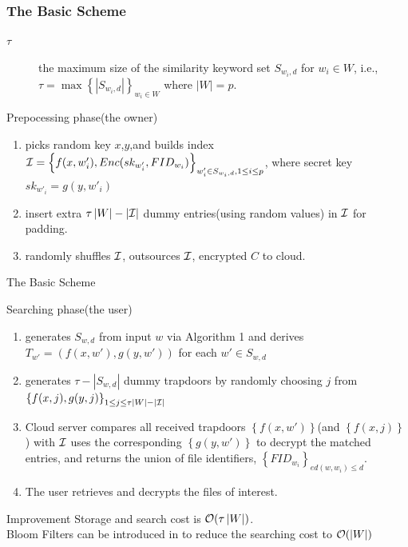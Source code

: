 \documentclass{beamer}
\begin{document}
\begin{frame}
	\frametitle{The Basic Scheme}
	\begin{block}{}
		\begin{description}
			\item[$\tau $]the maximum size of the similarity keyword set $S_{{w_i},d}$ for ${w_i} \in W$, i.e.,$\tau  = \max {\left\{ {\left| {{S_{{w_i},d}}} \right|} \right\}_{{w_i} \in W}}$ where $\left| W \right| = p$.
		\end{description}
	\end{block}
		\begin{exampleblock}{Prepocessing phase(the owner)}
			\begin{enumerate}
				\item  picks random key $x$,$y$,and builds index ${\cal I} = {\left\{ {f(x,w{'_i}),Enc(s{k_{w{'_i}}},FI{D_{{w_i}}})} \right\}_{w{'_i} \in {S_{{w_i},d}},1 \le i \le p}}$, where secret key $s{k_{w{'_i}}} = g(y,w{'_i})$
				\item insert extra $\tau \left| W \right| - \left| {\cal I} \right|$ dummy entries(using random values) in $\cal I$ for padding.
				\item randomly shuffles $\cal I$, outsources $\cal I$, encrypted $C$ to cloud.
			\end{enumerate}
		\end{exampleblock}
\end{frame}

\begin{frame}{The Basic Scheme}
	\begin{alertblock}{Searching phase(the user)}
		\begin{enumerate}
			\item generates ${{S_{w,d}}}$ from input $w$ via Algorithm 1 and derives ${T_{w'}} = (f(x,w'),g(y,w'))$ for each $w' \in {S_{w,d}}$
			\item generates $\tau  - \left| {{S_{w,d}}} \right|$ dummy trapdoors by randomly choosing $j$ from ${\left\{ {f(x,j),g(y,j)} \right\}_{1 \le j \le \tau \left| W \right| - \left| {\cal I} \right|}}$
			\item Cloud server compares all received trapdoors $\left\{ {f(x,w')} \right\}$(and $\left\{ {f(x,j)} \right\}$) with ${\cal I}$ uses the corresponding $\left\{ {g(y,w')} \right\}$ to decrypt the matched entries,  and returns the union of file identifiers, ${\left\{ {FI{D_{{w_i}}}} \right\}_{ed(w,{w_i}) \le d}}$.
			\item The user retrieves and decrypts the files of interest.
		\end{enumerate}
	\end{alertblock}
	\begin{block}{Improvement}
		Storage and search cost is ${\cal O}(\tau \left| W \right|)$.\\
		Bloom Filters can be introduced in to reduce the searching cost to  ${\cal O}( \left| W \right|)$
	\end{block}
\end{frame}
\end{document}
